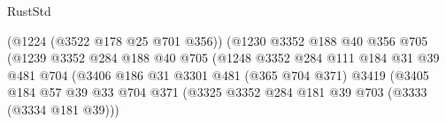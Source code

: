 \begin{lexlean}{RustStd}
\begin{coremodule}
                                                (@1224 (@3522 @178 @25 @701 @356))
                                                (@1230
                                                  @3352
                                                  @188
                                                  @40
                                                  @356
                                                  @705
                                                  (@1239
                                                    @3352
                                                    @284
                                                    @188
                                                    @40
                                                    @705
                                                    (@1248
                                                      @3352
                                                      @284
                                                      @111
                                                      @184
                                                      @31
                                                      @39
                                                      @481
                                                      @704
                                                      (@3406
                                                        @186
                                                        @31
                                                        @3301
                                                        @481
                                                        (@365 @704 @371)
                                                        @3419
                                                        (@3405
                                                          @184
                                                          @57
                                                          @39
                                                          @33
                                                          @704
                                                          @371
                                                          (@3325
                                                            @3352
                                                            @284
                                                            @181
                                                            @39
                                                            @703
                                                            (@3333 (@3334 @181 @39)))

\end{coremodule}
\end{lexlean}
